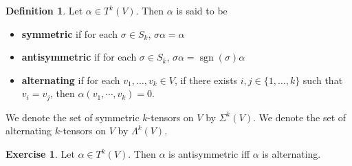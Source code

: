 \documentclass{book}
\theoremstyle{definition}
\newtheorem{defn}[definition]{Definition}
\newtheorem{ex}[definition]{Exercise}
\newcommand{\al}{\alpha}
\newcommand{\sig}{\sigma}
\newcommand{\Lam}{\Lambda}
\newcommand{\Sig}{\Sigma}
\DeclareMathOperator{\sgn}{sgn}
\DeclareMathOperator*{\0}{\mbf{0}}
\DeclareMathOperator*{\1}{\mbf{1}}
\begin{document}
	\begin{defn}
		Let $\al \in T^k(V)$. Then $\al$ is said to be 
		\begin{itemize}
			\item \textbf{symmetric} if for each $\sig \in S_k$, $\sig \al = \al$
			\item \textbf{antisymmetric} if for each $\sig \in S_k$, $\sig \al = \sgn(\sig) \al$
			\item \textbf{alternating} if for each $v_1, \ldots, v_k \in V$, if there exists $i,j \in \{1, \ldots, k\}$ such that $v_i = v_j$, then $\al(v_1, \cdots, v_k) = 0$.
		\end{itemize}
	We denote the set of symmetric $k$-tensors on $V$ by $\Sig^k(V)$. We denote the set of  alternating $k$-tensors on $V$ by $\Lam^k(V)$.
	\end{defn}

	\begin{ex}
		Let $\al \in T^k(V)$. Then $\al$ is antisymmetric iff $\al$ is alternating.
	\end{ex}
\end{document}
